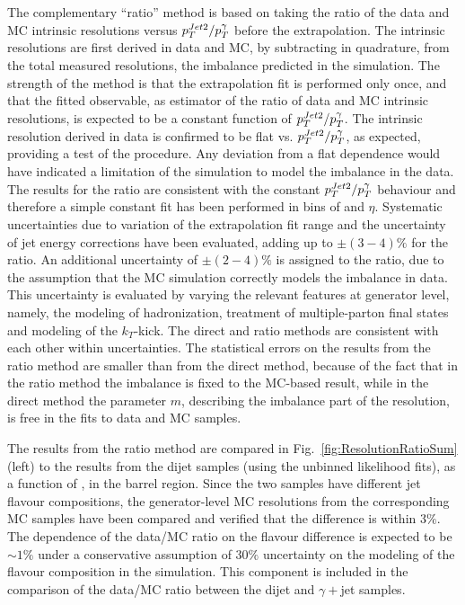 The complementary ``ratio'' method is based on taking the ratio of the data and MC intrinsic resolutions versus $p_{{T}}^{Jet2}/p_{{T}}^{\gamma}$ before the extrapolation. The intrinsic resolutions are first derived in data and MC, by subtracting in quadrature, from the total measured resolutions, the imbalance predicted in the simulation. The strength of the method is that the extrapolation fit is performed only once, and that the fitted observable, as estimator of the ratio of data and MC intrinsic resolutions, is expected to be a constant function of $p_{{T}}^{Jet2}/p_{{T}}^{\gamma}$. The intrinsic resolution derived in data is confirmed to be flat vs. $p_{{T}}^{Jet2}/p_{{T}}^{\gamma}$, as expected, providing a test of the procedure. Any deviation from a flat dependence would have indicated a limitation of the simulation to model the imbalance in the data. The results for the ratio are consistent with the constant $p_{{T}}^{Jet2}/p_{{T}}^{\gamma}$ behaviour and therefore a simple constant fit has been performed in bins of \pt and $\eta$. Systematic uncertainties due to variation of the extrapolation fit range and the uncertainty of jet energy corrections have been evaluated, adding up to $\pm (3-4)\%$ for the ratio. An additional uncertainty of $\pm (2-4)\%$ is assigned to the ratio, due to the assumption that the MC simulation correctly models the imbalance in data. This  uncertainty is evaluated by varying the relevant features at generator level, namely, the modeling of hadronization, treatment of multiple-parton final states and modeling of the $k_T$-kick. The direct and ratio methods are consistent with each other within uncertainties. The statistical errors on the results from the ratio method are smaller than 
from the direct method, because of the fact that in the ratio method the imbalance is fixed to the MC-based result, while in  the direct method the parameter $m$, describing the imbalance part of the resolution, is free in the fits to data and MC samples.

The results from the ratio method are compared in Fig.~\ref{fig:ResolutionRatioSum} (left) to the results from the dijet samples (using the unbinned likelihood fits), as a function of \pt, in the barrel region. Since the two samples have different jet flavour 
compositions, the generator-level MC resolutions from the corresponding MC samples  have been compared and verified that the difference is within $3\%$. The dependence of the data/MC ratio on the flavour difference is expected to be $\sim 1\%$ under a conservative assumption of $30\%$ uncertainty on the modeling of the flavour composition in the simulation.  This component is included in the comparison of the data/MC ratio between the dijet and $\gamma +$jet samples.

